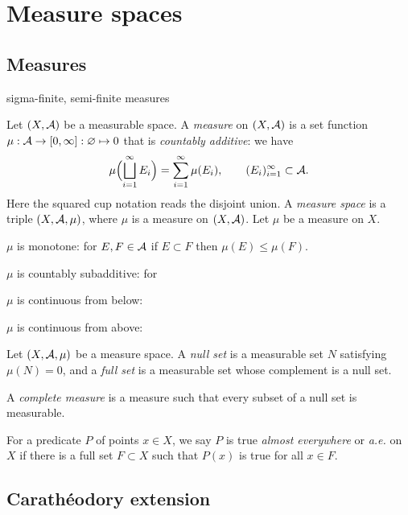 \documentclass{../../large}
\begin{document}
\chapter{Measure spaces}

\section{Measures}
sigma-finite, semi-finite measures

\begin{prb}
Let $(X,\mathcal{A})$ be a measurable space.
A \emph{measure} on $(X,\mathcal{A})$ is a set function $\mu:\mathcal{A}\to[0,\infty]:\varnothing\mapsto0$ that is \emph{countably additive}: we have
\[\mu\Bigl(\bigsqcup_{i=1}^\infty E_i\Bigr)=\sum_{i=1}^\infty\mu(E_i),\qquad(E_i)_{i=1}^\infty\subset\mathcal{A}.\]
Here the squared cup notation reads the disjoint union.
A \emph{measure space} is a triple $(X,\mathcal{A},\mu)$, where $\mu$ is a measure on $(X,\mathcal{A})$.
Let $\mu$ be a measure on $X$.
\begin{parts}
\item $\mu$ is monotone: for $E,F\in\mathcal{A}$ if $E\subset F$ then $\mu(E)\le\mu(F)$.
\item $\mu$ is countably subadditive: for
\item $\mu$ is continuous from below:
\item $\mu$ is continuous from above:
\end{parts}
\end{prb}


\begin{prb}
Let $(X,\mathcal{A},\mu)$ be a measure space.
A \emph{null set} is a measurable set $N$ satisfying $\mu(N)=0$, and a \emph{full set} is a measurable set whose complement is a null set.

A \emph{complete measure} is a measure such that every subset of a null set is measurable.

For a predicate $P$ of points $x\in X$, we say $P$ is true \emph{almost everywhere} or \emph{a.e.} on $X$ if there is a full set $F\subset X$ such that $P(x)$ is true for all $x\in F$.
\end{prb}





\section{Carath\'eodory extension}
\end{document}
